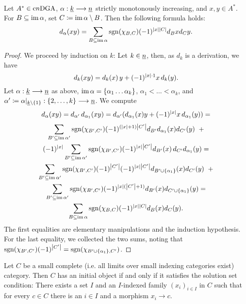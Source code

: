 %
%
\begin{lem}\label{lem_higher_leibniz_rel}
Let $A^* \in \mathrm{c}n\mathrm{DGA}$, $\alpha:\underline{k} \longrightarrow \underline{n}$ strictly monotonously increasing, and $x,y \in A^*$. For $B \subseteq \operatorname{im} \alpha$, set $C \coloneqq \operatorname{im} \alpha \setminus B$. Then the following formula holds:%
    \[ d_\alpha (xy) = \sum_{B \subseteq \operatorname{im} \alpha} \operatorname{sgn}( \chi_{B,C} ) (-1)^{\left\vert x\right\vert\left\vert C\right\vert} d_B x d_C y. \]
\begin{proof}
We proceed by induction on $k$: Let $k \in \underline{n}$, then, as $d_k$ is a derivation, we have
\[ d_k(xy) = d_k(x) \, y + (-1)^{\left\vert x\right\vert \cdot 1} x \, d_k(y). \]
Let $\alpha: \underline{k} \longrightarrow \underline{n}$ as above, $\operatorname{im} \alpha = \{ \alpha_1 \ldots \alpha_k \}$, $\alpha_1 \less \ldots \less \alpha_k$, and $\alpha^\prime \coloneqq \alpha|_{\underline{k} \setminus \{1\}}:\{2,\ldots,k\} \longrightarrow \underline{n}$. We compute
\begin{gather*}
  d_\alpha (xy) = d_{\alpha^\prime}\,d_{\alpha_1}(xy) =%
    d_{\alpha^\prime}( d_{\alpha_1}(x) y + (-1)^{\abs{x}} x \, d_{\alpha_1}(y) ) =\\[.3em]
  \sum_{B^\prime \subseteq \im \alpha^\prime} \sgn(\chi_{B^\prime,C^\prime}) %
    (-1)^{ (\abs{x}+1) \abs{C^\prime} } d_{B^\prime} d_{\alpha_1}(x)d_{C^\prime}(y) \;\; + \\%
  (-1)^{\abs{x}} \sum_{B^\prime \subseteq \im \alpha^\prime}%
    \sgn(\chi_{B^\prime,C^\prime}) (-1)^{ \abs{x} \abs{C^\prime} } %
    d_{B^\prime}(x) \, d_{C^\prime}d_{\alpha_1}(y) = \\ %
  \sum_{B^\prime \subseteq \im \alpha^\prime} \sgn(\chi_{B^\prime,C^\prime}) %
    (-1)^{\abs{C^\prime}}(-1)^{ \abs{x} \abs{C^\prime} } %
    d_{B^\prime \cup \{\alpha_1\} }(x) d_{C^\prime}(y) \;\; + \\%
  \sum_{B^\prime \subseteq \im \alpha^\prime} \sgn(\chi_{B^\prime,C^\prime}) %
    (-1)^{\abs{x}(\abs{C^\prime}+1)} %
    d_{B^\prime}(x) d_{C^\prime \cup \{\alpha_1\}}(y) = \\%
  \sum_{B \subseteq \im \alpha} \sgn( \chi_{B,C} ) (-1)^{\abs{x}\abs{C}} d_B (x) d_C (y).
\end{gather*}
The first equalities are elementary manipulations and the induction hypothesis. For the last equality, we collected the two sums, noting that %
  $\sgn(\chi_{B^\prime,C^\prime})(-1)^{\abs{C^\prime}} = %
    \sgn(\chi_{B^\prime \cup \{\alpha_1\},C^\prime})$.
\end{proof}
\end{lem}
%
%
\begin{lem}\label{lem_freyds_adjoint_functor}\cite[V.6 Theorem 1]{mac1978categories}
Let $C$ be a small complete (i.e. all limits over small indexing categories exist) category. Then $C$ has an initial object if and only if it satisfies the solution set condition: There exists a set $I$ and an $I$-indexed family $(x_i)_{i \in I}$ in $C$ such that for every $c \in C$ there is an $i \in I$ and a morphism $x_i \to c$.
\end{lem}
